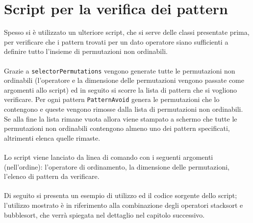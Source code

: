 \section*{Script per la verifica dei pattern}
Spesso si \`e utilizzato un ulteriore script, che si serve delle classi presentate prima, per verificare che i pattern trovati per un dato operatore siano sufficienti a definire tutto l'insieme di permutazioni non ordinabili.\\\\
Grazie a \texttt{selectorPermutations} vengono generate tutte le permutazioni non ordinabili (l'operatore e la dimensione delle permutazioni vengono passate come argomenti allo script) ed in seguito si scorre la lista di pattern che si vogliono verificare. Per ogni pattern \texttt{PatternAvoid} genera le permutazioni che lo contengono e queste vengono rimosse dalla lista di permutazioni non ordinabili. Se alla fine la lista rimane vuota allora viene stampato a schermo che tutte le permutazioni non ordinabili contengono almeno uno dei pattern specificati, altrimenti elenca quelle rimaste.\\\\
Lo script viene lanciato da linea di comando con i seguenti argomenti (nell'ordine): l'operatore di ordinamento, la dimensione delle permutazioni, l'elenco di pattern da verificare.\\\\
Di seguito si presenta un esempio di utilizzo ed il codice sorgente dello script; l'utilizzo mostrato \`e in riferimento alla combinazione degli operatori stacksort e bubblesort, che verr\`a spiegata nel dettaglio nel capitolo successivo.\\


